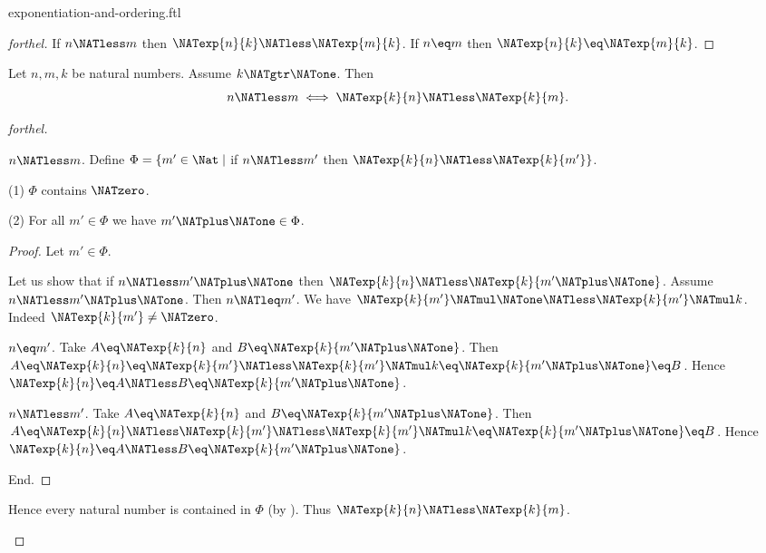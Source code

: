 \documentclass{naproche-library}
\begin{document}
\begin{smodule}[title=Exponentiation and Ordering]{exponentiation-and-ordering.ftl}
\begin{proof}[forthel]
  If $n \NATless m$ then $\NATexp{n}{k} \NATless \NATexp{m}{k}$.
  If $n \eq m$ then $\NATexp{n}{k} \eq \NATexp{m}{k}$.
\end{proof}

\begin{proposition}[forthel,id=ARITHMETIC_09_3349764703780864]
  Let $n, m, k$ be natural numbers.
  Assume $k \NATgtr \NATone$.
  Then \[ n \NATless m \iff \NATexp{k}{n} \NATless \NATexp{k}{m}. \]
\end{proposition}
\begin{proof}[forthel]
  \begin{case}{$n \NATless m$.}
    Define $\Phi = \{ m' \in \Nat \mid$ if $n \NATless m'$ then $\NATexp{k}{n} \NATless \NATexp{k}{m'} \}$.

    (1) $\Phi$ contains $\NATzero$.

    (2) For all $m' \in \Phi$ we have $m' \NATplus \NATone \in \Phi$.
    \begin{proof}
      Let $m' \in \Phi$.

      Let us show that if $n \NATless m' \NATplus \NATone$ then $\NATexp{k}{n} \NATless \NATexp{k}{m' \NATplus \NATone}$.
        Assume $n \NATless m' \NATplus \NATone$.
        Then $n \NATleq m'$.
        We have $\NATexp{k}{m'} \NATmul \NATone \NATless \NATexp{k}{m'} \NATmul k$.
        Indeed $\NATexp{k}{m'} \neq \NATzero$.

        \begin{case}{$n \eq m'$.}
          Take $A \eq \NATexp{k}{n}$ and $B \eq \NATexp{k}{m' \NATplus \NATone}$. %
          Then $A
            \eq \NATexp{k}{n}
            \eq \NATexp{k}{m'}
            \NATless \NATexp{k}{m'} \NATmul k
            \eq \NATexp{k}{m' \NATplus \NATone}
            \eq B$.
          Hence $\NATexp{k}{n} \eq A \NATless B \eq \NATexp{k}{m' \NATplus \NATone}$.
        \end{case}

        \begin{case}{$n \NATless m'$.}
          Take $A \eq \NATexp{k}{n}$ and $B \eq \NATexp{k}{m' \NATplus \NATone}$. %
          Then $A
            \eq \NATexp{k}{n}
            \NATless \NATexp{k}{m'}
            \NATless \NATexp{k}{m'} \NATmul k
            \eq \NATexp{k}{m' \NATplus \NATone}
            \eq B$.
          Hence $\NATexp{k}{n} \eq A \NATless B \eq \NATexp{k}{m' \NATplus \NATone}$.
        \end{case}
      End.
    \end{proof}

    Hence every natural number is contained in $\Phi$ (by ).
    Thus $\NATexp{k}{n} \NATless \NATexp{k}{m}$.
  \end{case}


\end{proof}
\end{smodule}
\end{document}
